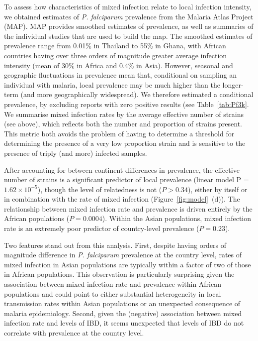 \documentclass[9pt,lineno]{elife}
\begin{document}
To assess how characteristics of mixed infection relate to local infection intensity, we obtained estimates of {\it P. falciparum} prevalence from the Malaria Atlas Project (MAP).  MAP provides smoothed estimates of prevalence, as well as summaries of the individual studies that are used to build the map. The smoothed estimates of prevalence  range from 0.01\% in Thailand to 55\% in Ghana, with African countries having over three orders of magnitude greater average infection intensity (mean of 30\% in Africa and 0.4\% in Asia). However, seasonal and geographic fluctuations in prevalence mean that, conditional on sampling an individual with malaria, local prevalence may be much higher than the longer-term (and more geographically widespread).  We therefore estimated a conditional prevalence, by excluding reports with zero positive results (see Table~\ref{tab:Pf3k}.
 We summarise mixed infection rates by the average effective number of strains (see above), which reflects both the number and proportion of strains present.  This metric both avoids the problem of having to determine a threshold for determining the presence of a very low proportion strain and is sensitive to the presence of triply (and more) infected samples.

After accounting for between-continent differences in prevalence, the effective number of strains is a significant predictor of local prevalence (linear model P = $1.62 \times 10^{-5}$), though the level of relatedness is not ($P>0.34$), either by itself or in combination with the rate of mixed infection (Figure~\ref{fig:model}~(d)).  The relationship between mixed infection rate and prevalence is driven entirely by the African populations ($P = 0.0004$).  Within the Asian populations, mixed infection rate is an extremely poor predictor of country-level prevalence ($P = 0.23$).

Two features stand out from this analysis.  First, despite having orders of magnitude difference in {\it P. falciparum} prevalence at the country level, rates of mixed infection in Asian populations are typically within a factor of two of those in African populations.  This observation is particularly surprising given the association between mixed infection rate and prevalence within African populations and could point to either substantial heterogeneity in local transmission rates within Asian populations or an unexpected consequence of malaria epidemiology.  Second, given the (negative) association between mixed infection rate and levels of IBD, it seems unexpected that levels of IBD do not correlate with prevalence at the country level.
\end{document}

